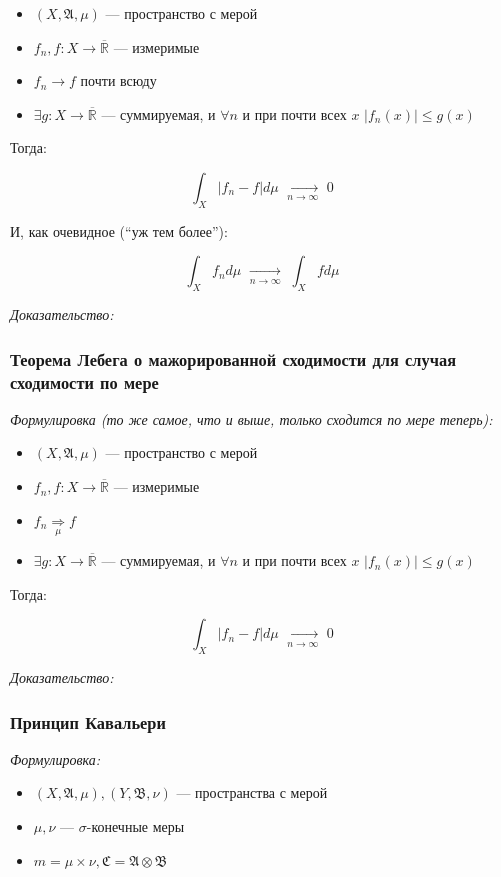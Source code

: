 \documentclass{article}
\def\dbl{\,\,}
\def\rinf{\overline{\mathbb{R}}}
\def\goesto#1{\underset{#1}{\longrightarrow}}
\def\toinf#1{\goesto{#1 \rightarrow \infty}}
\def\ntoinf{\toinf{n}}
\begin{document}
\begin{itemize}
    \item $(X, \mathfrak{A}, \mu)$ --- пространство с мерой
    \item $f_n, f: X \rightarrow \rinf$ --- измеримые
    \item $f_n \rightarrow f$ почти всюду
    \item $\exists g: X \rightarrow \rinf$ --- суммируемая, и $\forall n$ и при почти всех $x \dbl |f_n(x)| \le g(x)$
\end{itemize}

Тогда:

\[\int_{X}|f_n - f| d \mu \dbl \ntoinf \dbl 0\]

И, как очевидное (``уж тем более''):

\[\int_{X} f_n d\mu \dbl \ntoinf \dbl \int_{X} f d\mu\]

\textit{Доказательство:}

\subsubsection{Теорема Лебега о мажорированной сходимости для случая сходимости по мере}
\textit{Формулировка (то же самое, что и выше, только сходится по мере теперь):}

\begin{itemize}
    \item $(X, \mathfrak{A}, \mu)$ --- пространство с мерой
    \item $f_n, f: X \rightarrow \rinf$ --- измеримые
    \item $f_n \underset{\mu}{\Longrightarrow} f$
    \item $\exists g: X \rightarrow \rinf$ --- суммируемая, и $\forall n$ и при почти всех $x \dbl |f_n(x)| \le g(x)$
\end{itemize}

Тогда:

\[\int_{X}|f_n - f| d \mu \dbl \ntoinf \dbl 0\]

\textit{Доказательство:}

\subsubsection{Принцип Кавальери}
\textit{Формулировка:}

\begin{itemize}
    \item $(X, \mathfrak{A}, \mu), (Y, \mathfrak{B}, \nu)$ --- пространства с мерой
    \item $\mu, \nu$ --- $\sigma$-конечные меры
    \item $m = \mu \times \nu, \mathfrak{C} = \mathfrak{A} \otimes \mathfrak{B}$
\end{itemize}
\end{document}

